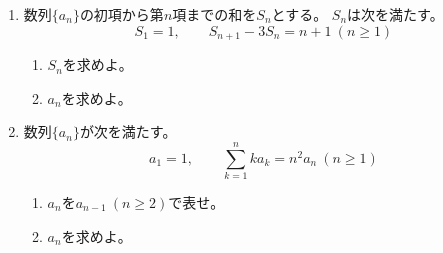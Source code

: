 \documentclass[12pt,b5paper]{ltjsarticle}
\begin{document}
\begin{enumerate}
 \item 数列$\{a_n\}$の初項から第$n$項までの和を$S_n$とする。
       $S_n$は次を満たす。
       \begin{equation}
        S_1=1
         ,\qquad
        S_{n+1}-3S_n = n+1 \ (n\geq 1)
       \end{equation}
       \begin{enumerate}
        \item $S_n$を求めよ。
        \item $a_n$を求めよ。
       \end{enumerate}
 \item 数列$\{a_n\}$が次を満たす。
       \begin{equation}
        a_1=1,\qquad \sum_{k=1}^n ka_k = n^2a_n \ (n\geq 1)
       \end{equation}
       \begin{enumerate}
        \item $a_n$を$a_{n-1} \ (n\geq 2)$で表せ。
        \item $a_n$を求めよ。
       \end{enumerate}
\end{enumerate}

\hrulefill
\end{document}
